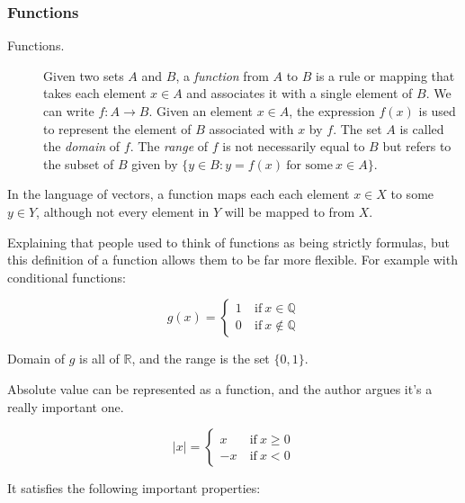 \documentclass{article}
\numberwithin{equation}{subsection}
\numberwithin{theo}{subsection}
\begin{document}
\subsubsection*{Functions}

\begin{description}
    \item[Functions.] Given two sets $A$ and $B$, a \emph{function} from $A$ to
        $B$ is a rule or mapping that takes each element $x \in A$ and
        associates it with a single element of $B$. We can write $f : A
        \rightarrow B$. Given an element $x \in A$, the expression $f(x)$ is
        used to represent the element of $B$ associated with $x$ by $f$. The set
        $A$ is called the \emph{domain} of $f$. The \emph{range} of $f$ is not
        necessarily equal to $B$ but refers to the subset of $B$ given by $\{y
        \in B : y = f(x)~ \text{for some}~x \in A\}$.
\end{description}

In the language of vectors, a function maps each each element $x \in X$ to some
$y \in Y$, although not every element in $Y$ will be mapped to from $X$.

Explaining that people used to think of functions as being strictly formulas,
but this definition of a function allows them to be far more flexible. For
example with conditional functions:

\begin{equation*}
    g(x) = 
    \begin{cases}
        1 & ~\text{if}~ x \in \mathbb{Q}\\
        0 & ~ \text{if}~ x \notin \mathbb{Q}
    \end{cases}
\end{equation*}

Domain of $g$ is all of $\mathbb{R}$, and the range is the set $\{0, 1\}$. 

Absolute value can be represented as a function, and the author argues it's a
really important one. 

\begin{equation*}
    \lvert x \rvert = 
    \begin{cases}
        x & ~\text{if} ~ x \geq 0 \\
        -x & ~\text{if} ~ x < 0
    \end{cases}
\end{equation*}

It satisfies the following important properties:
\end{document}
